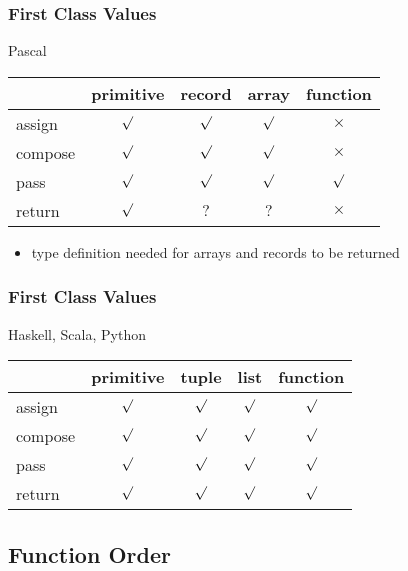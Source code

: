 \documentclass[dvipsnames]{beamer}
\theoremstyle{plain}
\begin{document}
\begin{frame}
  \frametitle{First Class Values}

  \begin{block}{Pascal}
    \begin{table}
      \begin{tabular}{l||c|c|c|c}
                & primitive & record  &  array  & function \\\hline\hline
        assign  &  $\surd$  & $\surd$ & $\surd$ & $\times$ \\\hline
        compose &  $\surd$  & $\surd$ & $\surd$ & $\times$ \\\hline
        pass    &  $\surd$  & $\surd$ & $\surd$ & $\surd$  \\\hline
        return  &  $\surd$  &   $?$   &   $?$   & $\times$
      \end{tabular}
    \end{table}
  \end{block}

  \begin{itemize}
    \item type definition needed for arrays and records to be returned
  \end{itemize}
\end{frame}

\begin{frame}
  \frametitle{First Class Values}

  \begin{block}{Haskell, Scala, Python}
    \begin{table}
      \begin{tabular}{l||c|c|c|c}
                & primitive &  tuple  &  list   & function\\\hline\hline
        assign  &  $\surd$  & $\surd$ & $\surd$ & $\surd$ \\\hline
        compose &  $\surd$  & $\surd$ & $\surd$ & $\surd$ \\\hline
        pass    &  $\surd$  & $\surd$ & $\surd$ & $\surd$ \\\hline
        return  &  $\surd$  & $\surd$ & $\surd$ & $\surd$
      \end{tabular}
    \end{table}
  \end{block}
\end{frame}

\subsection{Function Order}
\end{document}
